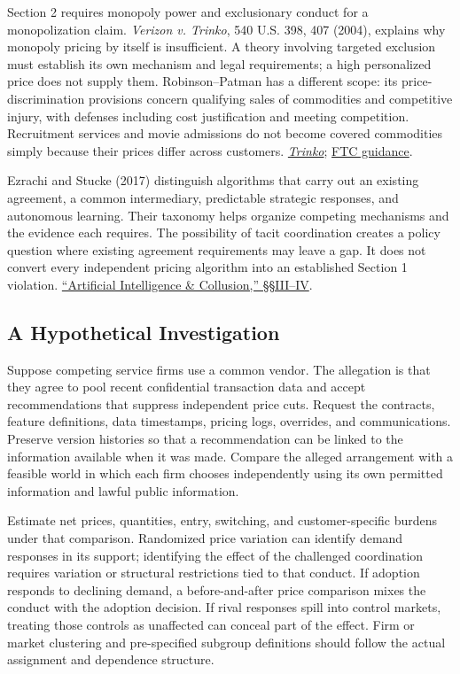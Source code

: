 Section 2 requires monopoly power and exclusionary conduct for a
monopolization claim. \emph{Verizon v. Trinko}, 540 U.S. 398, 407
(2004), explains why monopoly pricing by itself is insufficient. A
theory involving targeted exclusion must establish its own mechanism and
legal requirements; a high personalized price does not supply them.
Robinson--Patman has a different scope: its price-discrimination
provisions concern qualifying sales of commodities and competitive
injury, with defenses including cost justification and meeting
competition. Recruitment services and movie admissions do not become
covered commodities simply because their prices differ across customers.
\href{https://www.law.cornell.edu/supremecourt/text/02-682}{\emph{Trinko}};
\href{https://www.ftc.gov/advice-guidance/competition-guidance/guide-antitrust-laws/price-discrimination-robinson-patman-violations}{FTC
guidance}.

Ezrachi and Stucke (2017) distinguish algorithms that carry out an
existing agreement, a common intermediary, predictable strategic
responses, and autonomous learning. Their taxonomy helps organize
competing mechanisms and the evidence each requires. The possibility of
tacit coordination creates a policy question where existing agreement
requirements may leave a gap. It does not convert every independent
pricing algorithm into an established Section 1 violation.
\href{https://illinoislawreview.org/print/vol-2017-no-5/artificial-intelligence-collusion/}{``Artificial
Intelligence \& Collusion,'' §§III--IV}.

\hypertarget{M09-a-hypothetical-investigation}{%
\subsection{A Hypothetical
Investigation}\label{M09-a-hypothetical-investigation}}

\noindent \noindent Suppose competing service firms use a common vendor. The
allegation is that they agree to pool recent confidential transaction
data and accept recommendations that suppress independent price cuts.
Request the contracts, feature definitions, data timestamps, pricing
logs, overrides, and communications. Preserve version histories so that
a recommendation can be linked to the information available when it was
made. Compare the alleged arrangement with a feasible world in which
each firm chooses independently using its own permitted information and
lawful public information.

Estimate net prices, quantities, entry, switching, and customer-specific
burdens under that comparison. Randomized price variation can identify
demand responses in its support; identifying the effect of the
challenged coordination requires variation or structural restrictions
tied to that conduct. If adoption responds to declining demand, a
before-and-after price comparison mixes the conduct with the adoption
decision. If rival responses spill into control markets, treating those
controls as unaffected can conceal part of the effect. Firm or market
clustering and pre-specified subgroup definitions should follow the
actual assignment and dependence structure.

